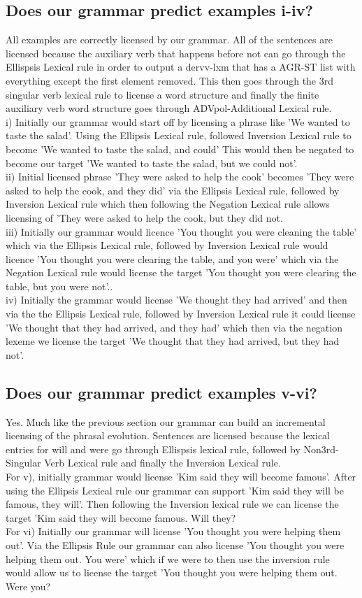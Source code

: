 \documentclass{article}
\begin{document}
\subsection{Does our grammar predict examples i-iv?}
All examples are correctly licensed by our grammar. All of the sentences are licensed because the auxiliary verb that happens before not can go through the Ellispsis Lexical rule in order to output a dervv-lxm that has a AGR-ST list with everything except the first element removed. This then goes through the 3rd singular verb lexical rule to license a word structure and finally the finite auxiliary verb word structure goes through ADVpol-Additional Lexical rule. \\  i) Initially our grammar would start off by licensing a phrase like 'We wanted to taste the salad'. Using the Ellipsis Lexical rule, followed Inversion Lexical rule to become 'We wanted to taste the salad, and could' This would then be negated to become our target 'We wanted to taste the salad, but we could not'. \\
ii) Initial licensed phrase 'They were asked to help the cook' becomes 'They were asked to help the cook, and they did' via the Ellipsis Lexical rule, followed by  Inversion Lexical rule which then following the Negation Lexical rule allows licensing of 'They were asked to help the cook, but they did not. \\
iii) Initially our grammar would licence 'You thought you were cleaning the table' which via the Ellipsis Lexical rule, followed by  Inversion Lexical rule would licence 'You thought you were clearing the table, and you were' which via the Negation Lexical rule would license the target 'You thought you were clearing the table, but you were not'.. \\
iv) Initially the grammar would license 'We thought they had arrived' and then via the the Ellipsis Lexical rule, followed by  Inversion Lexical rule it could license 'We thought that they had arrived, and they had' which then via the negation lexeme we license the target 'We thought that they had arrived, but they had not'.
\subsection{Does our grammar predict examples v-vi?}
Yes. Much like the previous section our grammar can build an incremental licensing of the phrasal evolution. Sentences are licensed because the lexical entries for will and were go through Ellispsis lexical rule, followed by Non3rd-Singular Verb Lexical rule and finally the Inversion Lexical rule.  \\ For v), initially grammar would license 'Kim said they will become famous'. After using the Ellipsis Lexical rule our grammar can support 'Kim said they will be famous, they will'. Then following the Inversion lexical rule we can license the target 'Kim said they will become famous. Will they? \\ For vi) Initially our grammar will license 'You thought you were helping them out'. Via the Ellipsis Rule our grammar can also license 'You thought you were helping them out. You were' which if we were to then use the inversion rule would allow us to license the target 'You thought you were helping them out. Were you?
\end{document}
